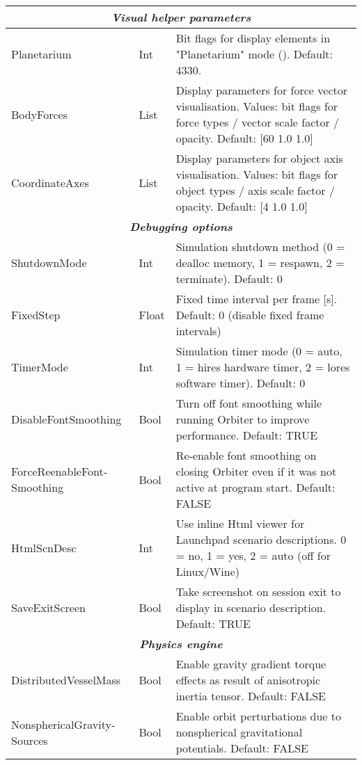 \documentclass[Orbiter User Manual.tex]{subfiles}
\begin{document}
\begin{longtable}{ |p{}|p{}|p{}| }
	\hline
	\multicolumn{3}{|c|}{\rule{0pt}{2ex}\textbf{\textit{Visual helper parameters}}}\\
	\hline\rule{0pt}{2ex}
	Planetarium & Int & Bit flags for display elements in "Planetarium" mode (\keystroke{F9}). Default: 4330.\\
	\hline\rule{0pt}{2ex}
	BodyForces & List & Display parameters for force vector visualisation. Values: bit flags for force types / vector scale factor / opacity. Default: [60 1.0 1.0]\\
	\hline\rule{0pt}{2ex}
	CoordinateAxes & List & Display parameters for object axis visualisation. Values: bit flags for object types / axis scale factor / opacity. Default: [4 1.0 1.0]\\
	\hline
	\multicolumn{3}{|c|}{\rule{0pt}{2ex}\textbf{\textit{Debugging options}}}\\
	\hline\rule{0pt}{2ex}
	ShutdownMode & Int & Simulation shutdown method (0 = dealloc memory, 1 = respawn, 2 = terminate). Default: 0\\
	\hline\rule{0pt}{2ex}
	FixedStep & Float & Fixed time interval per frame [s]. Default: 0 (disable fixed frame intervals)\\
	\hline\rule{0pt}{2ex}
	TimerMode & Int & Simulation timer mode (0 = auto, 1 = hires hardware timer, 2 = lores software timer). Default: 0\\
	\hline\rule{0pt}{2ex}
	DisableFontSmoothing & Bool & Turn off font smoothing while running Orbiter to improve performance. Default: TRUE\\
	\hline\rule{0pt}{2ex}
	ForceReenableFont­Smoothing & Bool & Re-enable font smoothing on closing Orbiter even if it was not active at program start. Default: FALSE\\
	\hline\rule{0pt}{2ex}
	HtmlScnDesc & Int & Use inline Html viewer for Launchpad scenario descriptions. 0 = no, 1 = yes, 2 = auto (off for Linux/Wine)\\
	\hline\rule{0pt}{2ex}
	SaveExitScreen & Bool & Take screenshot on session exit to display in scenario description. Default: TRUE\\
	\hline
	\multicolumn{3}{|c|}{\rule{0pt}{2ex}\textbf{\textit{Physics engine}}}\\
	\hline\rule{0pt}{2ex}
	DistributedVesselMass & Bool & Enable gravity gradient torque effects as result of anisotropic inertia tensor. Default: FALSE\\
	\hline\rule{0pt}{2ex}
	NonsphericalGravity­Sources & Bool & Enable orbit perturbations due to nonspherical gravitational potentials. Default: FALSE\\

\end{longtable}
\end{document}
